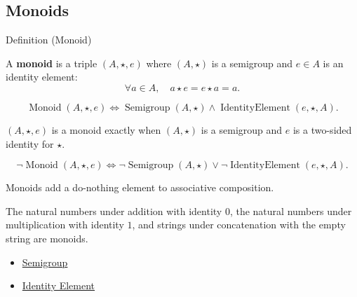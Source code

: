 \subsection*{Monoids}
\label{subsec:monoids}

\begin{definitionbox}{Definition (Monoid)}
\begin{definition}[Monoid]
\label{def:algebraic-monoid}
A \textbf{monoid} is a triple $(A,\star,e)$ where $(A,\star)$ is a semigroup
and $e\in A$ is an identity element:
\[
\forall a \in A,\quad a\star e=e\star a=a.
\]
\end{definition}
\end{definitionbox}

\begin{remark*}
\[
\operatorname{Monoid}(A,\star,e)
\Longleftrightarrow
\operatorname{Semigroup}(A,\star)
\land
\operatorname{IdentityElement}(e,\star,A).
\]
\end{remark*}

\begin{remark*}
$(A,\star,e)$ is a monoid exactly when $(A,\star)$ is a semigroup and $e$ is a
two-sided identity for $\star$.
\end{remark*}

\begin{remark*}
\[
\neg\operatorname{Monoid}(A,\star,e)
\Longleftrightarrow
\neg\operatorname{Semigroup}(A,\star)
\lor
\neg\operatorname{IdentityElement}(e,\star,A).
\]
\end{remark*}

\begin{remark*}[Interpretation]
Monoids add a do-nothing element to associative composition.
\end{remark*}

\begin{remark*}[Examples]
The natural numbers under addition with identity $0$, the natural numbers under
multiplication with identity $1$, and strings under concatenation with the
empty string are monoids.
\end{remark*}

\begin{dependencies}
\begin{itemize}
  \item \hyperref[def:algebraic-semigroup]{Semigroup}
  \item \hyperref[def:identity-element]{Identity Element}
\end{itemize}
\end{dependencies}
